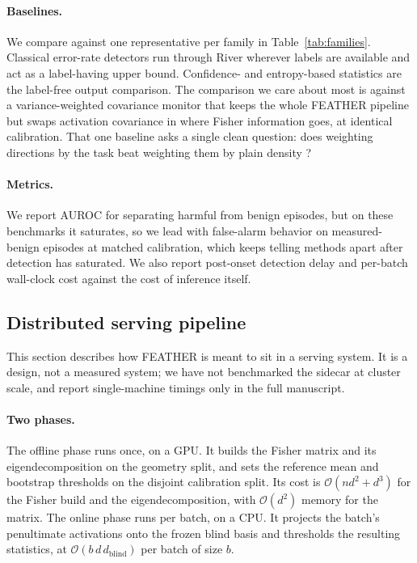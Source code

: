 \documentclass[sigconf,anonymous]{acmart}
\begin{document}
\paragraph{Baselines.}
We compare against one representative per family in
Table~\ref{tab:families}. Classical error-rate detectors run through River
\cite{montiel2021river} wherever labels are available and act as a
label-having upper bound. Confidence- and entropy-based statistics
\cite{hendrycks2017baseline, garg2022atc} are the label-free output
comparison. The comparison we care about most is against a variance-weighted
covariance monitor that keeps the whole FEATHER pipeline but swaps activation
covariance in where Fisher information goes, at identical calibration. That
one baseline asks a single clean question: does weighting directions by the
task beat weighting them by plain density \cite{lee2018mahalanobis}?

\paragraph{Metrics.}
We report AUROC for separating harmful from benign episodes, but on these
benchmarks it saturates, so we lead with false-alarm behavior on
measured-benign episodes at matched calibration, which keeps telling methods
apart after detection has saturated. We also report post-onset detection delay
and per-batch wall-clock cost against the cost of inference itself.

\subsection{Distributed serving pipeline}
\label{sec:deploy}

This section describes how FEATHER is meant to sit in a serving system. It is
a design, not a measured system; we have not benchmarked the sidecar at
cluster scale, and report single-machine timings only in the full manuscript.

\paragraph{Two phases.}
The offline phase runs once, on a GPU. It builds the Fisher matrix and its
eigendecomposition on the geometry split, and sets the reference mean and
bootstrap thresholds on the disjoint calibration split. Its cost is
$\mathcal{O}(n d^2 + d^3)$ for the Fisher build and the eigendecomposition,
with $\mathcal{O}(d^2)$ memory for the matrix. The online phase runs per
batch, on a CPU. It projects the batch's penultimate activations onto the
frozen blind basis and thresholds the resulting statistics, at
$\mathcal{O}(b\, d\, d_{\text{blind}})$ per batch of size $b$.
\end{document}
